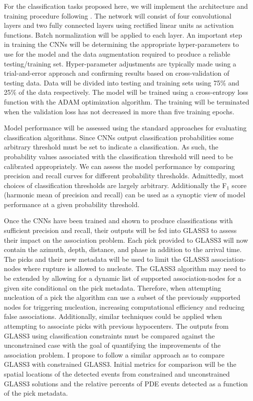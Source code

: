 \documentclass[12p]{article}
\begin{document}
For the classification tasks proposed here, we will implement the architecture and training procedure following \citet{Ross2018b}. The network will consist of four convolutional layers and two fully connected layers using rectified linear units as activation functions. Batch normalization will be applied to each layer. An important step in training the CNNs will be determining the appropriate hyper-parameters to use for the model and the data augmentation required to produce a reliable testing/training set. Hyper-parameter adjustments are typically made using a trial-and-error approach and confirming results based on cross-validation of testing data. Data will be divided into testing and training sets using 75\% and 25\% of the data respectively. The model will be trained using a cross-entropy loss function with the ADAM optimization algorithm. The training will be terminated when the validation loss has not decreased in more than five training epochs.

Model performance will be assessed using the standard approaches for evaluating classification algorithms. Since CNNs output classification probabilities some arbitrary threshold must be set to indicate a classification. As such, the probability values associated with the classification threshold will need to be calibrated appropriately. We can assess the model performance by comparing precision and recall curves for different probability thresholds. Admittedly, most choices of classification thresholds are largely arbitrary. Additionally the F$_1$ score (harmonic mean of precision and recall) can be used as a synoptic view of model performance at a given probability threshold.

Once the CNNs have been trained and shown to produce classifications with sufficient precision and recall, their outputs will be fed into GLASS3 to assess their impact on the association problem. Each pick provided to GLASS3 will now contain the azimuth, depth, distance, and phase in addition to the arrival time. The picks and their new metadata will be used to limit the GLASS3 association-nodes where rupture is allowed to nucleate. The GLASS3 algorithm may need to be extended by allowing for a dynamic list of supported association-nodes for a given site conditional on the pick metadata. Therefore, when attempting nucleation of a pick the algorithm can use a subset of the previously supported nodes for triggering nucleation, increasing computational efficiency and reducing false associations. Additionally, similar techniques could be applied when attempting to associate picks with previous hypocenters. The outputs from GLASS3 using classification constraints must be compared against the unconstrained case with the goal of quantifying the improvements of the association problem. I propose to follow a similar approach as \citet{Yeck2019} to compare GLASS3 with constrained GLASS3. Initial metrics for comparison will be the spatial locations of the detected events from constrained and unconstrained GLASS3 solutions and the relative percents of PDE events detected as a function of the pick metadata.
\end{document}
